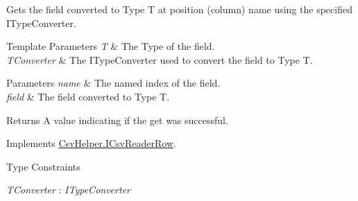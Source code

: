 Gets the field converted to Type T at position (column) name using the specified I\-Type\-Converter. 


\begin{DoxyTemplParams}{Template Parameters}
{\em T} & The Type of the field.\\
\hline
{\em T\-Converter} & The I\-Type\-Converter used to convert the field to Type T.\\
\hline
\end{DoxyTemplParams}

\begin{DoxyParams}{Parameters}
{\em name} & The named index of the field.\\
\hline
{\em field} & The field converted to Type T.\\
\hline
\end{DoxyParams}
\begin{DoxyReturn}{Returns}
A value indicating if the get was successful.
\end{DoxyReturn}


Implements \hyperlink{a00091_a9bd7b721a7b4acbc21050817aca71f21}{Csv\-Helper.\-I\-Csv\-Reader\-Row}.

\begin{Desc}
\item[Type Constraints]\begin{description}
\item[{\em T\-Converter} : {\em I\-Type\-Converter}]\end{description}
\end{Desc}

